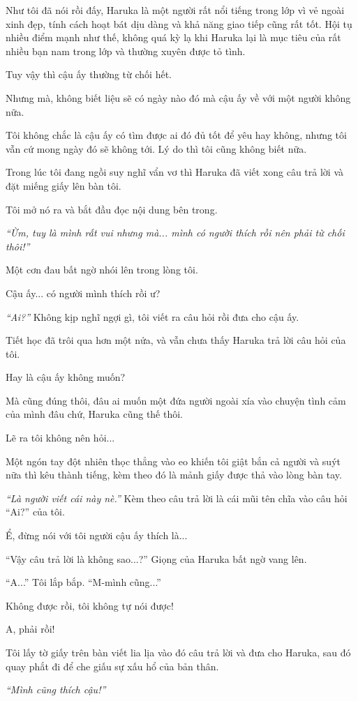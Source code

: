 {Như tôi đã nói rồi đấy, Haruka là một người rất nổi tiếng trong lớp vì
vẻ ngoài xinh đẹp, tính cách hoạt bát dịu dàng và khả năng giao tiếp
cũng rất tốt. Hội tụ nhiều điểm mạnh như thế, không quá kỳ lạ khi Haruka
lại là mục tiêu của rất nhiều bạn nam trong lớp và thường xuyên được tỏ
tình.

Tuy vậy thì cậu ấy thường từ chối hết.

Nhưng mà, không biết liệu sẽ có ngày nào đó mà cậu ấy về với một người
không nữa.

Tôi không chắc là cậu ấy có tìm được ai đó đủ tốt để yêu hay không,
nhưng tôi vẫn cứ mong ngày đó sẽ không tới. Lý do thì tôi cũng không
biết nữa.

Trong lúc tôi đang ngồi suy nghĩ vẩn vơ thì Haruka đã viết xong câu trả
lời và đặt miếng giấy lên bàn tôi.

Tôi mở nó ra và bắt đầu đọc nội dung bên trong.

\emph{``Ừm, tuy là mình rất vui nhưng mà... mình có người thích rồi nên
    phải từ chối thôi!''}

Một cơn đau bất ngờ nhói lên trong lòng tôi.

Cậu ấy... có người mình thích rồi ư?

\emph{``Ai?''} Không kịp nghĩ ngợi gì, tôi viết ra câu hỏi rồi đưa cho
cậu ấy.

Tiết học đã trôi qua hơn một nửa, và vẫn chưa thấy Haruka trả lời câu
hỏi của tôi.

Hay là cậu ấy không muốn?

Mà cũng đúng thôi, đâu ai muốn một đứa người ngoài xía vào chuyện tình
cảm của mình đâu chứ, Haruka cũng thế thôi.

Lẽ ra tôi không nên hỏi...

Một ngón tay đột nhiên thọc thẳng vào eo khiến tôi giật bắn cả người và
suýt nữa thì kêu thành tiếng, kèm theo đó là mảnh giấy được thả vào lòng
bàn tay.

\emph{``Là người viết cái này nè.''} Kèm theo câu trả lời là cái mũi tên
chĩa vào câu hỏi ``Ai?'' của tôi.

Ể, đừng nói với tôi người cậu ấy thích là...

``Vậy câu trả lời là không sao...?'' Giọng của Haruka bất ngờ vang lên.

``A...'' Tôi lắp bắp. ``M-mình cũng...''

Không được rồi, tôi không tự nói được!

A, phải rồi!

Tôi lấy tờ giấy trên bàn viết lia lịa vào đó câu trả lời và đưa cho
Haruka, sau đó quay phắt đi để che giấu sự xấu hổ của bản thân.

\emph{``Mình cũng thích cậu!''}
}
